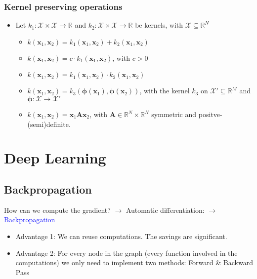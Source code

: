 \documentclass[a4paper,10pt,twoside=true,DIV=10,headsepline,plainheadsepline]{scrartcl}
\begin{document}
		\subsubsection{Kernel preserving operations}

		\begin{itemize}
				\item Let $k_1 : \mathcal{X} \times \mathcal{X} \rightarrow \mathbb{R}$ and $k_2 : \mathcal{X} \times \mathcal{X} \rightarrow \mathbb{R}$ be kernels, with $\mathcal{X}  \subseteq \mathbb{R}^N$
				\begin{itemize}
 					\item $k(\mathbf{x}_1, \mathbf{x}_2) = k_1(\mathbf{x}_1, \mathbf{x}_2) + k_2(\mathbf{x}_1, \mathbf{x}_2)$
					\item $k(\mathbf{x}_1, \mathbf{x}_2) = c \cdot k_1(\mathbf{x}_1, \mathbf{x}_2)$, with $c > 0$
					\item $k(\mathbf{x}_1, \mathbf{x}_2) = k_1(\mathbf{x}_1, \mathbf{x}_2) \cdot k_2(\mathbf{x}_1, \mathbf{x}_2)$
					\item $k(\mathbf{x}_1, \mathbf{x}_2) = k_3(\mathbf{\phi}(\mathbf{x}_1), \mathbf{\phi}(\mathbf{x}_2))$, with the kernel $k_3$ on $\mathcal{X}' \subseteq \mathbb{R}^M$ and $\mathbf{\phi}: \mathcal{X} \rightarrow \mathcal{X}'$
					\item $k(\mathbf{x}_1, \mathbf{x}_2) = \mathbf{x}_1 \mathbf{A} \mathbf{x}_2$, with $\mathbf{A} \in \mathbb{R}^N \times \mathbb{R}^N$ symmetric and positve-(semi)definite.
				\end{itemize}
			\end{itemize}


	\section{Deep Learning}
	\subsection{Backpropagation}
	How can we compute the gradient? $\rightarrow$ Automatic differentiation: $\rightarrow$ \textcolor{blue}{Backpropagation}

	\begin{itemize}
 		\item Advantage 1: We can reuse computations. The savings are significant.
		\item Advantage 2: For every node in the graph (every function involved in the
computations) we only need to implement two methods: Forward \& Backward Pass
	\end{itemize}
\end{document}
